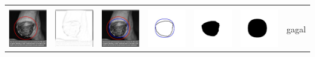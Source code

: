 \begin{table}[H]
\begin{tabular}{|m{0.7in}|m{0.7in}|m{0.7in}|m{0.7in}|m{0.7in}|m{0.7in}|m{0.7in}|}
		&  &  & & & &  \\
		\includegraphics[width=0.7in]{dataset/dataset_3/luka_hitam/ready/4_integer_init.jpg}&
		\includegraphics[width=0.7in]{dataset/dataset_3/luka_hitam/ready/4_integer_ext.jpg}&
		\includegraphics[width=0.7in]{dataset/dataset_3/luka_hitam/ready/4_integer_result.jpg}&
		\includegraphics[width=0.7in]{dataset/dataset_3/luka_hitam/ready/4_gt_r_integer.jpg}&
		\includegraphics[width=0.7in]{dataset/dataset_3/luka_hitam/ready/4_r.jpg}&
		\includegraphics[width=0.7in]{dataset/dataset_3/luka_hitam/ready/4_integer_r.jpg}&
		gagal\\
		\hline
		
	\end{tabular}
\end{table}

